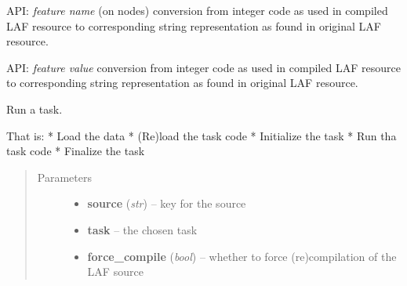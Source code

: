 \documentclass[letterpaper,10pt,english]{sphinxmanual}
\begin{document}
\begin{fulllineitems}
\begin{fulllineitems}
\end{fulllineitems}


\begin{fulllineitems}
\label{graf/graf:graf.GrafTask.rep_fname_node}
API: \emph{feature name} (on nodes) conversion from integer code as used in compiled LAF resource
to corresponding string representation as found in original LAF resource.

\end{fulllineitems}


\begin{fulllineitems}
\label{graf/graf:graf.GrafTask.rep_fval}
API: \emph{feature value} conversion from integer code as used in compiled LAF resource
to corresponding string representation as found in original LAF resource.

\end{fulllineitems}


\begin{fulllineitems}
\label{graf/graf:graf.GrafTask.result_files}
\end{fulllineitems}


\begin{fulllineitems}
\label{graf/graf:graf.GrafTask.run}
Run a task.

That is:
* Load the data
* (Re)load the task code
* Initialize the task
* Run tha task code
* Finalize the task
\begin{quote}\begin{description}
\item[{Parameters}] \leavevmode\begin{itemize}
\item {} 
\textbf{source} (\emph{str}) --
key for the source

\item {} 
\textbf{task} --
the chosen task

\item {} 
\textbf{force\_compile} (\emph{bool}) --
whether to force (re)compilation of the LAF source

\end{itemize}

\end{description}\end{quote}

\end{fulllineitems}


\end{fulllineitems}
\end{document}

